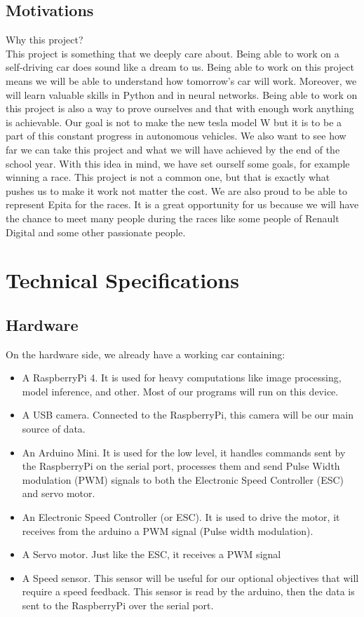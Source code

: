 \documentclass[12pt]{article}
\begin{document}
\subsection{Motivations}
Why this project? \\
This project is something that we deeply care about. Being able to work on a self-driving car does sound like a dream to us. Being able to work on this project means we will be able to understand how tomorrow's car will work. Moreover, we will learn valuable skills in Python and in neural networks. 
Being able to work on this project is also a way to prove ourselves and that with enough work anything is achievable.
Our goal is not to make the new tesla model W but it is to be a part of this constant progress in autonomous vehicles. We also want to see how far we can take this project and what we will have achieved by the end of the school year. With this idea in mind, we have set ourself some goals, for example winning a race. This project is not a common one, but that is exactly what pushes us to make it work not matter the cost. We are also proud to be able to represent Epita for the races. 
It is a great opportunity for us because we will have the chance to meet many people during the races like some people of Renault Digital and some other passionate people.

\section{Technical Specifications}

\subsection{Hardware}
On the hardware side, we already have a working car containing:
\begin{itemize}
\item A RaspberryPi 4. It is used for heavy computations like image processing, model inference, and other. Most of our programs will run on this device.
\item A USB camera. Connected to the RaspberryPi, this camera will be our main source of data.
\item An Arduino Mini. It is used for the low level, it handles commands sent by the RaspberryPi on the serial port, processes them and send Pulse Width modulation (PWM) signals to both the Electronic Speed Controller (ESC) and servo motor.
\item An Electronic Speed Controller (or ESC). It is used to drive the motor, it receives  from the arduino a PWM signal (Pulse width modulation).
\item A Servo motor. Just like the ESC, it receives a PWM signal
\item A Speed sensor. This sensor will be useful for our optional objectives that will require a speed feedback. This sensor is read by the arduino, then the data is sent to the RaspberryPi over the serial port.
\end{itemize}
\end{document}

